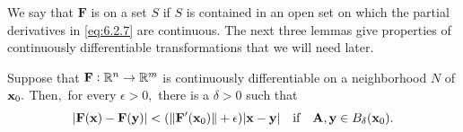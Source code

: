 We say that $\mathbf{F}$ is  on a set
$S$ if $S$ is contained in an open set on which the partial
derivatives
in \eqref{eq:6.2.7} are continuous. The next three lemmas give properties
of continuously differentiable transformations that we will need
later.

\begin{lemma}\label{thmtype:6.2.5}
Suppose that $\mathbf{F}:\mathbb{R}^n\to\mathbb{R}^m$ is continuously
differentiable on a neighborhood $N$ of $\mathbf{ x}_0.$ Then$,$ for every
$\epsilon>0,$ there is a $\delta>0$ such that
\begin{equation}\label{eq:6.2.8}
|\mathbf{F}(\mathbf{ x})-\mathbf{F}(\mathbf{ y})|<
(\|\mathbf{F}'(\mathbf{ x}_{0})\|
+\epsilon) |\mathbf{ x}-\mathbf{ y}|
\mbox{\quad if\quad}\mathbf{A},\mathbf{ y}\in B_\delta (\mathbf{ x}_0).
\end{equation}
\end{lemma}

